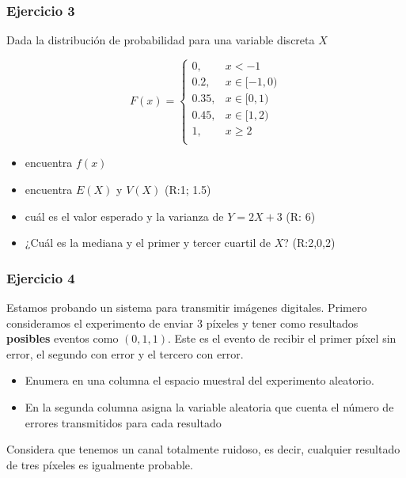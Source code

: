 \documentclass[
]{book}
\providecommand{\tightlist}{%
  \setlength{\itemsep}{0pt}\setlength{\parskip}{0pt}}
\begin{document}
\hypertarget{ejercicio-3-2}{%
\subsubsection{Ejercicio 3}\label{ejercicio-3-2}}

Dada la distribución de probabilidad para una variable discreta \(X\)

\[
    F(x)= 
\begin{cases}
0, & x < -1 \\
0.2,& x \in [-1,0)\\
0.35,& x \in [0,1)\\
0.45,& x \in [1,2)\\
1,& x \geq 2\\
\end{cases}
\]

\begin{itemize}
\tightlist
\item
  encuentra \(f(x)\)
\item
  encuentra \(E(X)\) y \(V(X)\) (R:1; 1.5)
\item
  cuál es el valor esperado y la varianza de \(Y=2X+3\) (R: 6)
\item
  ¿Cuál es la mediana y el primer y tercer cuartil de \(X\)? (R:2,0,2)
\end{itemize}

\hypertarget{ejercicio-4-1}{%
\subsubsection{Ejercicio 4}\label{ejercicio-4-1}}

Estamos probando un sistema para transmitir imágenes digitales. Primero consideramos el experimento de enviar \(3\) píxeles y tener como resultados \textbf{posibles} eventos como \((0,1,1)\). Este es el evento de recibir el primer píxel sin error, el segundo con error y el tercero con error.

\begin{itemize}
\item
  Enumera en una columna el espacio muestral del experimento aleatorio.
\item
  En la segunda columna asigna la variable aleatoria que cuenta el número de errores transmitidos para cada resultado
\end{itemize}

Considera que tenemos un canal totalmente ruidoso, es decir, cualquier resultado de tres píxeles es igualmente probable.
\end{document}
